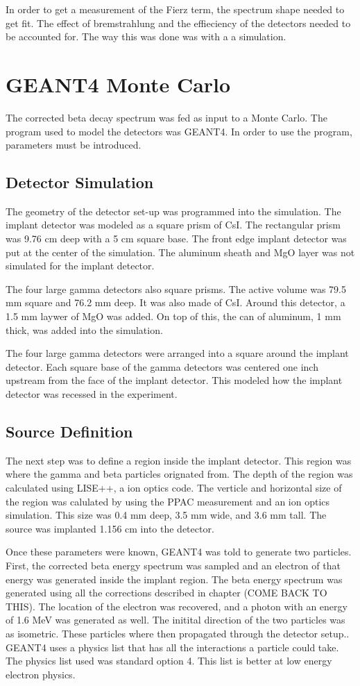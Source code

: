 In order to get a measurement of the Fierz term, the spectrum shape needed to get fit.
The effect of bremstrahlung and the effieciency of the detectors needed to be accounted for.
The way this was done was with a a simulation.

\section{GEANT4 Monte Carlo}
The corrected beta decay spectrum was fed as input to a Monte Carlo.
The program used to model the detectors was GEANT4.
In order to use the program, parameters must be introduced.

\subsection{Detector Simulation}
The geometry of the detector set-up was programmed into the simulation.
The implant detector was modeled as a square prism of CsI.
The rectangular prism was 9.76 cm deep with a 5 cm square base.
The front edge implant detector was put at the center of the simulation.
The aluminum sheath and MgO layer was not simulated for the implant detector.

The four large gamma detectors also square prisms.
The active volume was 79.5 mm square and 76.2 mm deep.
It was also made of CsI.
Around this detector, a 1.5 mm laywer of MgO was added.
On top of this, the can of aluminum, 1 mm thick, was added into the simulation.

The four large gamma detectors were arranged into a square around the implant detector.
Each square base of the gamma detectors was centered one inch upstream from the face of the implant detector.
This modeled how the implant detector was recessed in the experiment. 

\subsection{Source Definition}
The next step was to define a region inside the implant detector.
This region was where the gamma and beta particles orignated from.
The depth of the region was calculated using LISE++, a ion optics code.
The verticle and horizontal size of the region was calulated by using the PPAC measurement and an ion optics simulation.
This size was 0.4 mm deep, 3.5 mm wide, and 3.6 mm tall.
The source was implanted 1.156 cm into the detector.

Once these parameters were known, GEANT4 was told to generate two particles.
First, the corrected beta energy spectrum was sampled and an electron of that energy was generated inside the implant region.
The beta energy spectrum was generated using all the corrections described in chapter (COME BACK TO THIS).
The location of the electron was recovered, and a photon with an energy of  1.6 MeV was generated as well.
The initital direction of the two particles was as isometric.
These particles where then propagated through the detector setup..
GEANT4 uses a physics list that has all the interactions a particle could take.
The physics list used was standard option 4.
This list is better at low energy electron physics. 

